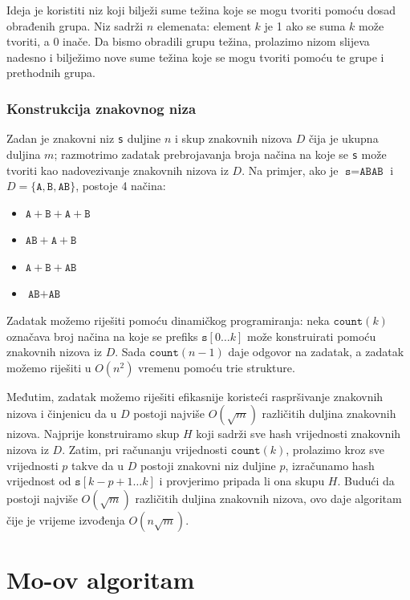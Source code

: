 Ideja je koristiti niz koji bilježi sume težina
koje se mogu tvoriti pomoću dosad obrađenih grupa.
Niz sadrži $n$ elemenata: element $k$ je 1 ako se suma
$k$ može tvoriti, a 0 inače.
Da bismo obradili grupu težina, prolazimo nizom
slijeva nadesno i bilježimo nove sume težina koje
se mogu tvoriti pomoću te grupe i prethodnih grupa.

\subsubsection{Konstrukcija znakovnog niza}

Zadan je znakovni niz \texttt{s} duljine $n$
i skup znakovnih nizova $D$ čija je ukupna duljina $m$;
razmotrimo zadatak prebrojavanja broja načina na koje se
\texttt{s} može tvoriti kao nadovezivanje znakovnih nizova iz $D$.
Na primjer,
ako je $\texttt{s}=\texttt{ABAB}$ i
$D=\{\texttt{A},\texttt{B},\texttt{AB}\}$,
postoje 4 načina:

\begin{itemize}[noitemsep]
\item $\texttt{A}+\texttt{B}+\texttt{A}+\texttt{B}$
\item $\texttt{AB}+\texttt{A}+\texttt{B}$
\item $\texttt{A}+\texttt{B}+\texttt{AB}$
\item $\texttt{AB}+\texttt{AB}$
\end{itemize}

Zadatak možemo riješiti pomoću dinamičkog programiranja:
neka $\texttt{count}(k)$ označava broj načina na koje se prefiks
$\texttt{s}[0 \ldots k]$ može konstruirati pomoću znakovnih nizova iz $D$.
Sada $\texttt{count}(n-1)$ daje odgovor na zadatak,
a zadatak možemo riješiti u $O(n^2)$ vremenu
pomoću trie strukture.

Međutim, zadatak možemo riješiti efikasnije
koristeći raspršivanje znakovnih nizova i činjenicu da u $D$
postoji najviše $O(\sqrt m)$ različitih duljina znakovnih nizova.
Najprije konstruiramo skup $H$ koji sadrži sve
hash vrijednosti znakovnih nizova iz $D$.
Zatim, pri računanju vrijednosti $\texttt{count}(k)$,
prolazimo kroz sve vrijednosti $p$
takve da u $D$ postoji znakovni niz duljine $p$,
izračunamo hash vrijednost od $\texttt{s}[k-p+1 \ldots k]$
i provjerimo pripada li ona skupu $H$.
Budući da postoji najviše $O(\sqrt m)$ različitih duljina znakovnih nizova,
ovo daje algoritam čije je vrijeme izvođenja $O(n \sqrt m)$.

\section{Mo-ov algoritam}

